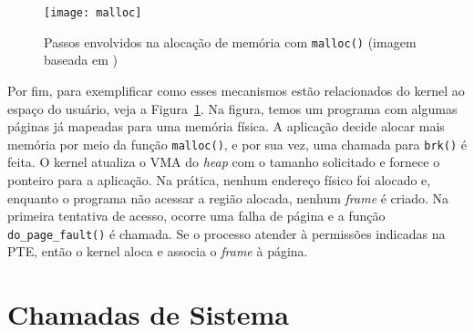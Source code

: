 %

\begin{figure}[!h]
  \centering
  \texttt{[image: malloc]}
  \caption[Passos envolvidos na alocação de memória com \texttt{malloc()}]{Passos envolvidos na alocação de memória com \texttt{malloc()} (imagem baseada em \cite{anatomy_program_mem})}
  \label{fig:malloc_linux}
\end{figure}

Por fim, para exemplificar como esses mecanismos estão relacionados do kernel ao
espaço do usuário, veja a Figura~\ref{fig:malloc_linux}. Na figura, temos um programa com
algumas páginas já mapeadas para uma memória física. A aplicação decide alocar
mais memória por meio da função \texttt{malloc()}, e por sua vez, uma chamada
para \texttt{brk()} é feita. O kernel atualiza o VMA do \textit{heap} com o
tamanho solicitado e fornece o ponteiro para a aplicação. Na prática, nenhum
endereço físico foi alocado e, enquanto o programa não acessar a região alocada,
nenhum \emph{frame} é criado. Na primeira tentativa de acesso, ocorre uma falha
de página e a função \texttt{do\_page\_fault()} é chamada. Se o processo
atender à permissões indicadas na PTE, então o kernel aloca e associa o
\emph{frame} à página.

\section{Chamadas de Sistema}

